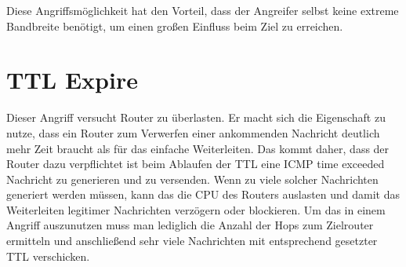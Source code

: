 Diese Angriffsmöglichkeit hat den Vorteil, dass der Angreifer selbst keine extreme Bandbreite benötigt, um einen großen Einfluss beim Ziel zu erreichen.

\section{TTL Expire}

Dieser Angriff versucht Router zu überlasten. Er macht sich die Eigenschaft zu nutze, dass ein Router zum Verwerfen einer ankommenden Nachricht deutlich mehr Zeit braucht als für das einfache Weiterleiten. Das kommt daher, dass der Router dazu verpflichtet ist beim Ablaufen der TTL eine ICMP time exceeded Nachricht zu generieren und zu versenden. Wenn zu viele solcher Nachrichten generiert werden müssen, kann das die CPU des Routers auslasten und damit das Weiterleiten legitimer Nachrichten verzögern oder blockieren. Um das in einem Angriff auszunutzen muss man lediglich die Anzahl der Hops zum Zielrouter ermitteln und anschließend sehr viele Nachrichten mit entsprechend gesetzter TTL verschicken.